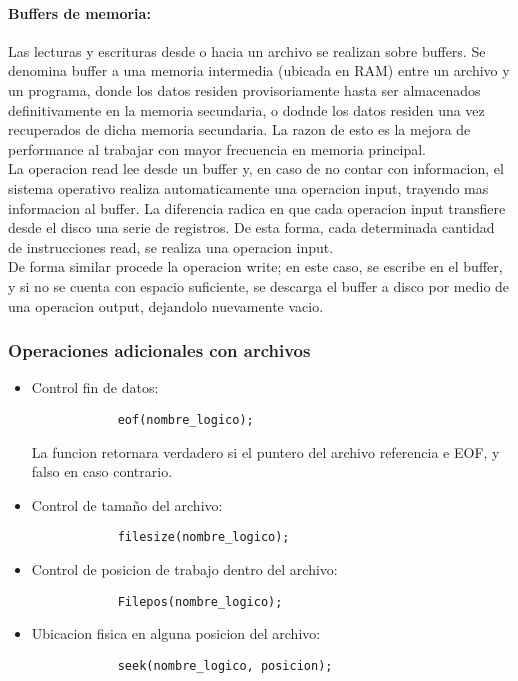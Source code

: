 \paragraph{Buffers de memoria:} Las lecturas y escrituras desde o hacia un archivo se realizan sobre buffers. Se denomina buffer a una memoria intermedia (ubicada en RAM) entre un archivo y un programa, donde los datos residen provisoriamente hasta ser almacenados definitivamente en la memoria secundaria, o dodnde los datos residen una vez recuperados de dicha memoria secundaria. La razon de esto es la mejora de performance al trabajar con mayor frecuencia en memoria principal. \\
La operacion read lee desde un buffer y, en caso de no contar con informacion, el sistema operativo realiza automaticamente una operacion input, trayendo mas informacion al buffer. La diferencia radica en que cada operacion input transfiere desde el disco una serie de registros. De esta forma, cada determinada cantidad de instrucciones read, se realiza una operacion input.\\
De forma similar procede la operacion write; en este caso, se escribe en el buffer, y si no se cuenta con espacio suficiente, se descarga el buffer a disco por medio de una operacion output, dejandolo nuevamente vacio.

\subsubsection{Operaciones adicionales con archivos}

\begin{itemize}
    \item Control fin de datos:
        \begin{lstlisting}
            eof(nombre_logico);
        \end{lstlisting}
    La funcion retornara verdadero si el puntero del archivo referencia e EOF, y falso en caso contrario.
    \item Control de tamaño del archivo:
        \begin{lstlisting}
            filesize(nombre_logico);
        \end{lstlisting}
    \item Control de posicion de trabajo dentro del archivo:
        \begin{lstlisting}
            Filepos(nombre_logico);
        \end{lstlisting}
    \item Ubicacion fisica en alguna posicion del archivo:
        \begin{lstlisting}
            seek(nombre_logico, posicion);
        \end{lstlisting}
\end{itemize}
